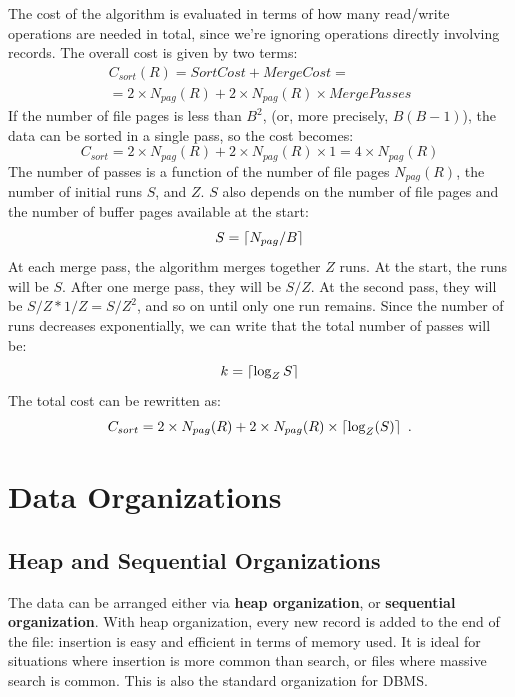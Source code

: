 The cost of the algorithm is evaluated in terms of how many read/write operations are needed in total, since we're ignoring operations directly involving records. The overall cost is given by two terms:
\begin{align*}
    C_{sort}(R) = SortCost + MergeCost = \\
    = 2 \times N_{pag}(R) + 2 \times N_{pag}(R) \times MergePasses
\end{align*}
If the number of file pages is less than $B^2$, (or, more precisely, $B(B-1)$), the data can be sorted in a single pass, so the cost becomes:
\begin{equation*}
    C_{sort} = 2 \times N_{pag}(R) + 2 \times N_{pag}(R) \times 1 = 4 \times N_{pag}(R)
\end{equation*}
The number of passes is a function of the number of file pages $N_{pag}(R)$, the number of initial runs $S$, and $Z$. $S$ also depends on the number of file pages and the number of buffer pages available at the start:
\begin{equation*}
    S = \left\lceil N_{pag}/B\right\rceil
\end{equation*}
At each merge pass, the algorithm merges together $Z$ runs. At the start, the runs will be $S$. After one merge pass, they will be $S/Z$. At the second pass, they will be $S/Z * 1/Z = S/Z^2$, and so on until only one run remains. Since the number of runs decreases exponentially, we can write that the total number of passes will be:
\begin{equation*}
    k = \left\lceil\log_Z{S}\right\rceil
\end{equation*}
The total cost can be rewritten as:
\begin{equation*}
    C_{sort} = 2 \times N_{pag}(R) + 2 \times N_{pag}(R) \times \ceil{\log_Z(S)} \ .
\end{equation*}

\section{Data Organizations}

\subsection{Heap and Sequential Organizations}

The data can be arranged either via \textbf{heap organization}, or \textbf{sequential organization}. With heap organization, every new record is added to the end of the file: insertion is easy and efficient in terms of memory used. It is ideal for situations where insertion is more common than search, or files where massive search is common. This is also the standard organization for DBMS.

